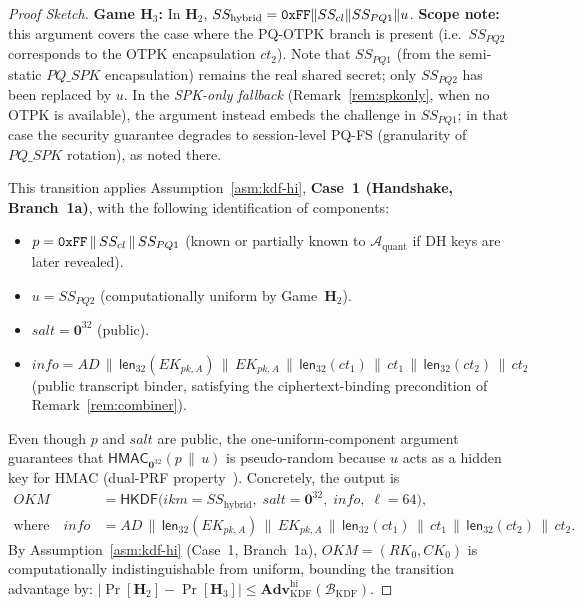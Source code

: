 \documentclass[11pt,a4paper]{article}
\theoremstyle{remark}
\theoremstyle{plain}
\newcommand{\Adv}{\mathbf{Adv}}
\newcommand{\calA}{\mathcal{A}}
\newcommand{\HKDF}{\mathsf{HKDF}}
\newcommand{\flen}[1]{\mathsf{len}_{32}(#1)}
\newcommand{\hexlit}[1]{\text{\upshape\texttt{#1}}}
\newcommand{\Hgame}[1]{\mathbf{H}_{#1}}
\begin{document}
\begin{proof}[Proof Sketch]
\medskip\noindent
\textbf{Game $\Hgame{3}$:}  In $\Hgame{2}$,
$SS_{\text{hybrid}} = \hexlit{0xFF} \| SS_{cl} \| SS_{PQ1} \| u$.
\textbf{Scope note:} this argument covers the case where the PQ-OTPK branch is present
(i.e.\ $SS_{PQ2}$ corresponds to the OTPK encapsulation $ct_2$).  Note that $SS_{PQ1}$
(from the semi-static $PQ\_SPK$ encapsulation) remains the real shared secret; only $SS_{PQ2}$
has been replaced by $u$.  In the \emph{SPK-only fallback} (Remark~\ref{rem:spkonly}, when no
OTPK is available), the argument instead embeds the challenge in $SS_{PQ1}$; in that case the
security guarantee degrades to session-level PQ-FS (granularity of $PQ\_SPK$ rotation), as
noted there.

This transition applies Assumption~\ref{asm:kdf-hi}, \textbf{Case~1 (Handshake, Branch~1a)}, with the
following identification of components:
\begin{itemize}
  \item $p = \hexlit{0xFF} \,\|\, SS_{cl} \,\|\, SS_{PQ1}$ (known or partially known to
        $\calA_{\mathrm{quant}}$ if DH keys are later revealed).
  \item $u = SS_{PQ2}$ (computationally uniform by Game~$\Hgame{2}$).
  \item $salt = \mathbf{0}^{32}$ (public).
  \item $info = AD \,\|\, \flen{EK_{pk,A}} \,\|\, EK_{pk,A} \,\|\, \flen{ct_1} \,\|\, ct_1
               \,\|\, \flen{ct_2} \,\|\, ct_2$ (public transcript binder, satisfying the
        ciphertext-binding precondition of Remark~\ref{rem:combiner}).
\end{itemize}
Even though $p$ and $salt$ are public, the one-uniform-component argument guarantees that
$\mathsf{HMAC}_{\mathbf{0}^{32}}(p \,\|\, u)$ is pseudo-random because $u$ acts as a hidden
key for HMAC (dual-PRF property~\cite{krawczyk2010hkdf}).  Concretely, the output is
\begin{align*}
  OKM &= \HKDF\bigl(ikm = SS_{\text{hybrid}},\; salt = \mathbf{0}^{32},\; info,\; \ell = 64\bigr), \\
  \text{where}\quad info &= AD \,\|\, \flen{EK_{pk,A}} \,\|\, EK_{pk,A} \,\|\, \flen{ct_1} \,\|\, ct_1 \,\|\, \flen{ct_2} \,\|\, ct_2.
\end{align*}
By Assumption~\ref{asm:kdf-hi} (Case~1, Branch~1a), $OKM = (RK_0, CK_0)$ is computationally indistinguishable from uniform, bounding the transition advantage by:
$|\Pr[\Hgame{2}] - \Pr[\Hgame{3}]| \leq \Adv^{\mathrm{hi}}_{\mathrm{KDF}}(\mathcal{B}_{\mathrm{KDF}})$.


\end{proof}
\end{document}
